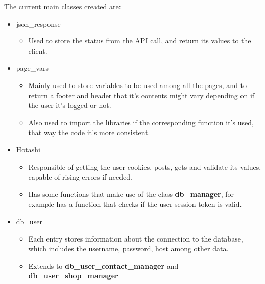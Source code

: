 \begin{flushleft}
    The current main classes created are:
    \begin{itemize}
        \item json\_response
        \begin{itemize}
                \item Used to store the status from the API call, and return its values to the client.
        \end{itemize}
    \end{itemize}
    \begin{itemize}
        \item page\_vars
        \begin{itemize}
            \item Mainly used to store variables to be used among all the pages, and to return a footer and header
            that it's contents might vary depending on if the user it's logged or not.
            \item Also used to import the libraries if the corresponding function it's used, that way the code it's more consistent.
        \end{itemize}
    \end{itemize}
    \begin{itemize}
        \item Hotashi
        \begin{itemize}
            \item Responsible of getting the user cookies, posts, gets and validate its values, capable of rising errors if needed.
            \item Has some functions that make use of the class \textbf{db\_manager}, for example has a function that checks if the user session token is valid.
        \end{itemize}
    \end{itemize}
    \begin{itemize}
        \item db\_user
        \begin{itemize}
            \item Each entry stores information about the connection to the database, which includes the username, password, host among other data.
            \item Extends to \textbf{db\_user\_contact\_manager} and \textbf{db\_user\_shop\_manager}
        \end{itemize}
    \end{itemize}
    \begin{itemize}

\end{itemize}
\end{flushleft}
